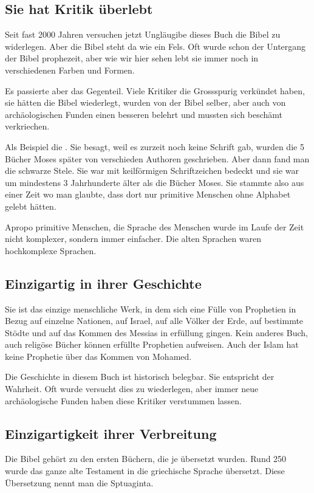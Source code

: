 \subsection{Sie hat Kritik überlebt}

Seit fast 2000 Jahren versuchen jetzt Ungläugibe dieses Buch die Bibel zu widerlegen. Aber die Bibel steht da wie ein Fels. Oft wurde schon der Untergang der Bibel prophezeit, aber wie wir hier sehen lebt sie immer noch in verschiedenen Farben und Formen.

Es passierte aber das Gegenteil. Viele Kritiker die Grossspurig verkündet haben, sie hätten die Bibel wiederlegt, wurden von der Bibel selber, aber auch von archäologischen Funden einen besseren belehrt und mussten sich beschämt verkriechen.

Als Beispiel die . Sie besagt, weil es zurzeit noch keine Schrift gab, wurden die 5 Bücher Moses später von verschieden Authoren geschrieben. Aber dann fand man die schwarze Stele. Sie war mit keilförmigen Schriftzeichen bedeckt und sie war um mindestens 3 Jahrhunderte älter als die Bücher Moses. Sie stammte also aus einer Zeit wo man glaubte, dass dort nur primitive Menschen ohne Alphabet gelebt hätten.

Apropo primitive Menschen, die Sprache des Menschen wurde im Laufe der Zeit nicht komplexer, sondern immer einfacher. Die alten Sprachen waren hochkomplexe Sprachen.

\subsection{Einzigartig in ihrer Geschichte}
Sie ist das einzige menschliche Werk, in dem sich eine Fülle von Prophetien in Bezug auf einzelne Nationen, auf Israel, auf alle Völker der Erde, auf bestimmte Stödte und auf das Kommen des Messias in erfüllung gingen. Kein anderes Buch, auch religöse Bücher können erfüllte Prophetien aufweisen. Auch der Islam hat keine Prophetie über das Kommen von Mohamed.

Die Geschichte in diesem Buch ist historisch belegbar. Sie entspricht der Wahrheit. Oft wurde versucht dies zu wiederlegen, aber immer neue archäologische Funden haben diese Kritiker verstummen lassen.

\subsection{Einzigartigkeit ihrer Verbreitung}
Die Bibel gehört zu den ersten Büchern, die je übersetzt wurden. Rund 250 \vChr{} wurde das ganze alte Testament in die griechische Sprache übersetzt. Diese Übersetzung nennt man die Sptuaginta.

